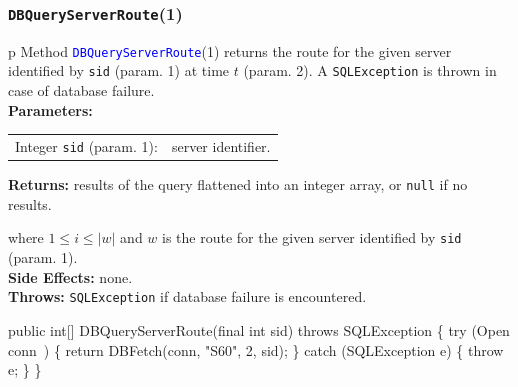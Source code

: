 \documentclass{article}
\def\nwendcode{\endtrivlist \endgroup}      %
\let\nwdocspar=\par
\theoremstyle{definition}                   %
\begin{document}
\subsubsection{{\tt{}\protect{}DBQueryServerRoute}(1)}
\begin{tabular}{p{\textwidth}}
\toprule
{}
Method \textcolor{blue}{{\tt{}\protect{}DBQueryServerRoute}}(1) returns the route for the
given server identified by {\tt{}sid} (param. 1) at time $t$ (param. 2).
A {\tt{}SQLException} is thrown in case of database failure.\\
\midrule
\textbf{Parameters:} \\
\begin{tabular}{lp{116mm}}
Integer {\tt{}sid} (param. 1):&server identifier.\\
\end{tabular}
\textbf{Returns:} results of the query flattened into an integer array,
or {\tt{}null} if no results.


where $1\leq i\leq |w|$ and $w$ is the route for the given server
identified by {\tt{}sid} (param. 1).\\
\textbf{Side Effects:} none.\\
\textbf{Throws:} {\tt{}SQLException} if database failure is encountered.\\
\bottomrule
\end{tabular}
\nwenddocs{}\endmoddef{}
public int[] DBQueryServerRoute(final int sid) throws SQLException \{
  try (\LA{}Open \code{}conn\edoc{}~{\nwtagstyle{}}\RA{}) \{
    return DBFetch(conn, "S60", 2, sid);
  \} catch (SQLException e) \{
    throw e;
  \}
\}
\eatline
{}\nwendcode{}\nwdocspar
\end{document}
